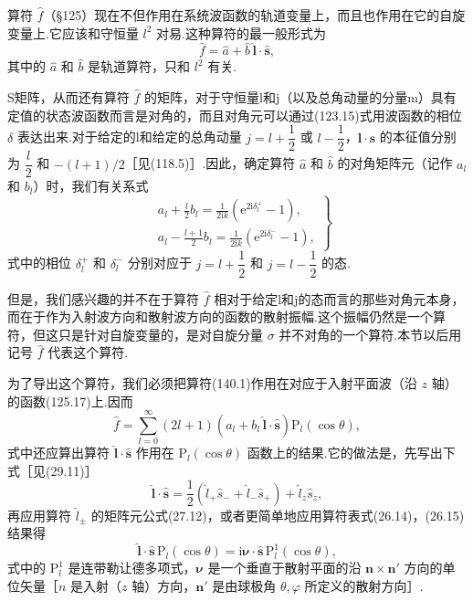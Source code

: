 算符 $\hat{f}$（§125）现在不但作用在系统波函数的轨道变量上，而且也作用在它的自旋变量上.它应该和守恒量 $l^2$ 对易.这种算符的最一般形式为
\begin{equation}
  \hat{f}=\hat{a}+\hat{b}\,\hat{\boldsymbol{l}}\cdot\hat{\boldsymbol{s}},
\end{equation}
其中的 $\hat{a}$ 和 $\hat{b}$ 是轨道算符，只和 $l^2$ 有关.

S矩阵，从而还有算符 $\hat{f}$ 的矩阵，对于守恒量l和j（以及总角动量的分量m）具有定值的状态波函数而言是对角的，而且对角元可以通过(123.15)式用波函数的相位 $\delta$ 表达出来.对于给定的l和给定的总角动量 $j=l+\dfrac{1}{2}$ 或 $l-\dfrac{1}{2}$，$\boldsymbol{l}\cdot\boldsymbol{s}$ 的本征值分别为 $\dfrac{l}{2}$ 和 $-(l+1)/2$［见(118.5)］.因此，确定算符 $\hat{a}$ 和 $\hat{b}$ 的对角矩阵元（记作 $a_l$ 和 $b_l$）时，我们有关系式
\begin{equation}
\left.
\begin{aligned}
  &a_l+\frac{l}{2}b_l
  =\frac{1}{2\mathrm{i}k}
  \left(\mathrm{e}^{2\mathrm{i}\delta_l^{+}}-1\right),\\
  &a_l-\frac{l+1}{2}b_l
  =\frac{1}{2\mathrm{i}k}
  \left(\mathrm{e}^{2\mathrm{i}\delta_l^{-}}-1\right),
\end{aligned}
\right\}
\end{equation}
式中的相位 $\delta_l^{+}$ 和 $\delta_l^{-}$ 分别对应于 $j=l+\dfrac{1}{2}$ 和 $j=l-\dfrac{1}{2}$ 的态.

但是，我们感兴趣的并不在于算符 $\hat{f}$ 相对于给定l和j的态而言的那些对角元本身，而在于作为入射波方向和散射波方向的函数的散射振幅.这个振幅仍然是一个算符，但这只是针对自旋变量的，是对自旋分量 $\sigma$ 并不对角的一个算符.本节以后用记号 $\hat{f}$ 代表这个算符.

为了导出这个算符，我们必须把算符(140.1)作用在对应于入射平面波（沿 $z$ 轴）的函数(125.17)上.因而
\begin{equation}
  \hat{f}=\sum_{l=0}^{\infty}(2l+1)
  \left(a_l+b_l\,\hat{\boldsymbol{l}}\cdot\hat{\boldsymbol{s}}\right)
  \mathrm{P}_l(\cos\theta),
\end{equation}
式中还应算出算符 $\hat{\boldsymbol{l}}\cdot\hat{\boldsymbol{s}}$ 作用在 $\mathrm{P}_l(\cos\theta)$ 函数上的结果.它的做法是，先写出下式［见(29.11)］
\begin{equation*}
  \hat{\boldsymbol{l}}\cdot\hat{\boldsymbol{s}}
  =\frac{1}{2}\left(\hat{l}_{+}\hat{s}_{-}
  +\hat{l}_{-}\hat{s}_{+}\right)+\hat{l}_z\hat{s}_z,
\end{equation*}
再应用算符 $\hat{l}_{\pm}$ 的矩阵元公式(27.12)，或者更简单地应用算符表式(26.14)，(26.15)结果得
\begin{equation*}
  \hat{\boldsymbol{l}}\cdot\hat{\boldsymbol{s}}\,
  \mathrm{P}_l(\cos\theta)
  =\mathrm{i}\boldsymbol{\nu}\cdot\hat{\boldsymbol{s}}\,
  \mathrm{P}_l^{1}(\cos\theta),
\end{equation*}
式中的 $\mathrm{P}_l^1$ 是连带勒让德多项式，$\boldsymbol{\nu}$ 是一个垂直于散射平面的沿
$\boldsymbol{n}\times\boldsymbol{n}'$ 方向的单位矢量［$n$ 是入射（$z$ 轴）方向，$\boldsymbol{n}'$ 是由球极角 $\theta,\varphi$ 所定义的散射方向］.

